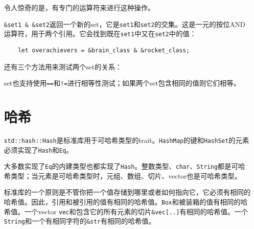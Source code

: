 令人惊奇的是，有专门的运算符来进行这种操作。

\texttt{\&set1 \& \&set2}返回一个新的set，它是\texttt{set1}和\texttt{set2}的交集。这是一元的按位AND运算符，用于两个引用。它会找到既在\texttt{set1}中又在\texttt{set2}中的值：
\begin{verbatim}
    let overachievers = &brain_class & &rocket_class;
\end{verbatim}




还有三个方法用来测试两个set的关系：




set也支持使用\texttt{==}和\texttt{!=}进行相等性测试；如果两个set包含相同的值则它们相等。

\section{哈希}

\texttt{std::hash::Hash}是标准库用于可哈希类型的trait。\texttt{HashMap}的键和\texttt{HashSet}的元素必须实现了\texttt{Hash}和\texttt{Eq}。

大多数实现了\texttt{Eq}的内建类型也都实现了\texttt{Hash}。整数类型、\texttt{char}、\texttt{String}都是可哈希类型；当元素是可哈希类型时，元组、数组、切片、vector也是可哈希类型。

标准库的一个原则是不管你把一个值存储到哪里或者如何指向它，它必须有相同的哈希值。因此，引用和被引用的值有相同的哈希值。\texttt{Box}和被装箱的值有相同的哈希值。一个vector \texttt{vec}和包含它的所有元素的切片\texttt{\&vec[..]}有相同的哈希值。一个\texttt{String}和一个有相同字符的\texttt{\&str}有相同的哈希值。

